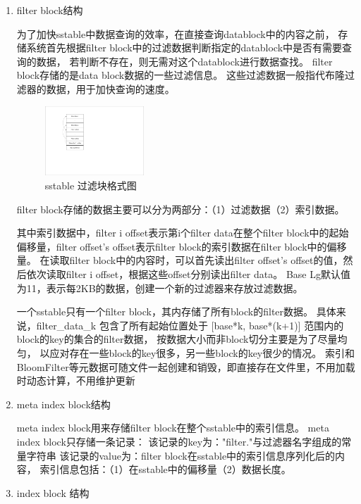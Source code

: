\begin{enumerate}
\begin{enumerate}
	\item filter block结构
	
	为了加快sstable中数据查询的效率，在直接查询datablock中的内容之前，
	存储系统首先根据filter block中的过滤数据判断指定的datablock中是否有需要查询的数据，
	若判断不存在，则无需对这个datablock进行数据查找。
	filter block存储的是data block数据的一些过滤信息。
	这些过滤数据一般指代布隆过滤器的数据，用于加快查询的速度。
	
	\begin{figure}[H]
		\centering
		\includegraphics[width=0.35\textwidth]{pdf/filterblock_format.pdf}
		\caption{sstable 过滤块格式图}
		\label{sstable_filterblock_format}
	\end{figure}

	filter block存储的数据主要可以分为两部分：（1）过滤数据（2）索引数据。
	
	其中索引数据中，filter i offset表示第i个filter data在整个filter block中的起始偏移量，filter offset's offset表示filter block的索引数据在filter block中的偏移量。
	在读取filter block中的内容时，可以首先读出filter offset's offset的值，然后依次读取filter i offset，根据这些offset分别读出filter data。
	Base Lg默认值为11，表示每2KB的数据，创建一个新的过滤器来存放过滤数据。
	
	一个sstable只有一个filter block，其内存储了所有block的filter数据。
	具体来说，filter\_data\_k 包含了所有起始位置处于 [base*k, base*(k+1)]
	范围内的block的key的集合的filter数据，
	按数据大小而非block切分主要是为了尽量均匀，
	以应对存在一些block的key很多，另一些block的key很少的情况。
	索引和BloomFilter等元数据可随文件一起创建和销毁，即直接存在文件里，不用加载时动态计算，不用维护更新
				
	\item meta index block结构
	
	meta index block用来存储filter block在整个sstable中的索引信息。
meta index block只存储一条记录：
该记录的key为："filter."与过滤器名字组成的常量字符串
该记录的value为：filter block在sstable中的索引信息序列化后的内容，
索引信息包括：（1）在sstable中的偏移量（2）数据长度。

	\item index block 结构
	

\end{enumerate}
\end{enumerate}
